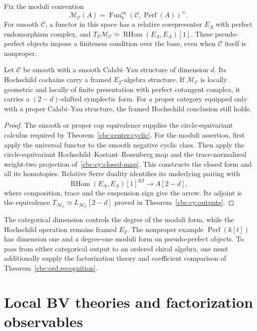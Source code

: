 Fix the moduli convention
\[
 \mathcal M_{\mathcal C}(A)=
 \operatorname{Fun}^{\mathrm{ex}}_k
       (\mathcal C,\operatorname{Perf}(A))^{\simeq}.
\]
For smooth $\mathcal C$, a functor in this space has a relative corepresenter $E_A$ with perfect endomorphism complex, and
$T_F\mathcal M_{\mathcal C}\simeq\operatorname{RHom}(E_A,E_A)[1]$.
These pseudo-perfect objects impose a finiteness condition over the base, even when $\mathcal C$ itself is nonproper.

\begin{theorem}\label{cbc:cy:consumer}
Let $\mathcal C$ be smooth with a smooth Calabi--Yau structure of dimension $d$.
Its Hochschild cochains carry a framed $E_2$-algebra structure.
If $\mathcal M_{\mathcal C}$ is locally geometric and locally of finite presentation with perfect cotangent complex, it carries a $(2-d)$-shifted symplectic form.
For a proper category equipped only with a proper Calabi--Yau structure, the framed Hochschild conclusion still holds.
\end{theorem}
\begin{proof}
The smooth or proper cap equivalence supplies the circle-equivariant calculus required by Theorem~\ref{cbc:center:cyclic}.
For the moduli assertion, first apply the universal functor to the smooth negative cyclic class.
Then apply the circle-equivariant Hochschild--Kostant--Rosenberg map and the trace-normalized weight-two projection of~\eqref{cbc:cy:closed-map}.
This constructs the closed form and all its homotopies.
Relative Serre duality identifies its underlying pairing with
\[
 \operatorname{RHom}(E_A,E_A)[1]^{\otimes2}
       \longrightarrow A[2-d],
\]
where composition, trace and the suspension sign give the arrow.
Its adjoint is the equivalence $T_{\mathcal M_{\mathcal C}}\simeq L_{\mathcal M_{\mathcal C}}[2-d]$ proved in Theorem~\ref{cbc:cy:outputs}.
\end{proof}

The categorical dimension controls the degree of the moduli form, while the Hochschild operation remains framed $E_2$.
The nonproper example $\operatorname{Perf}(k[t])$ has dimension one and a degree-one moduli form on pseudo-perfect objects.
To pass from either categorical output to an ordered chiral algebra, one must additionally supply the factorization theory and coefficient comparison of Theorem~\ref{cbc:ord:recognition}.

\chapter{Local BV theories and factorization observables}
